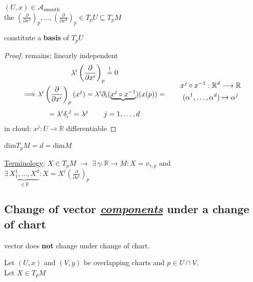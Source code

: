 \begin{definition}
  $(U,x) \in \mathcal{A}_{\text{smooth}}$ \\
the $\left( \frac{ \partial }{ \partial x^1} \right)_p , \dots , \left( \frac{ \partial }{ \partial x^d} \right)_p \in T_pU \subseteq T_pM$

constitute a \textbf{basis} of $T_pU$

\end{definition}

\begin{proof} remains: linearly independent 
  \[
\begin{gathered}
\lambda^i \left( \frac{ \partial }{ \partial x^i} \right)_p \overset{!}{=} 0  \\
 \Longrightarrow \lambda^i \left( \frac{ \partial }{ \partial x^i} \right)_p(x^j) = \lambda^i \partial_i (\underbrace{ x^j \circ x^{-1} }_{} )( x(p)) = \\
 = \lambda^i \delta_i^{\,\,j} = \lambda^j \quad \quad \, j = 1 , \dots , d
\end{gathered} \quad \quad \, \begin{gathered}
  x^j \circ x^{-1} : \mathbb{R}^d \longrightarrow \mathbb{R} \\
  (\alpha^1 , \dots , \alpha^d) \mapsto \alpha^j 
\end{gathered}
\]
in cloud: $x^j : U \to \mathbb{R}$ differentiable




\end{proof}


\begin{corollary}
 $ \text{dim}T_pM = d = \text{dim}M$
\end{corollary}

\underline{Terminology}: $X \in T_pM$ $\to $ $\exists \, \gamma : \mathbb{R} \to M : X = v_{\gamma,p}$ and \\
 $\exists \, \underbrace{ X_1^1 , \dots , X^d }_{\in \mathbb{R} } : X = X^i \left( \frac{ \partial }{ \partial x^i} \right)_p$



\subsection{Change of vector \emph{\underline{components}} under a change of chart}

 vector does \textbf{not} change under change of chart.

Let $(U,x)$ and $(V,y)$ be overlapping charts and $p \in U\cap V$.  \\
Let $X \in T_pM$

